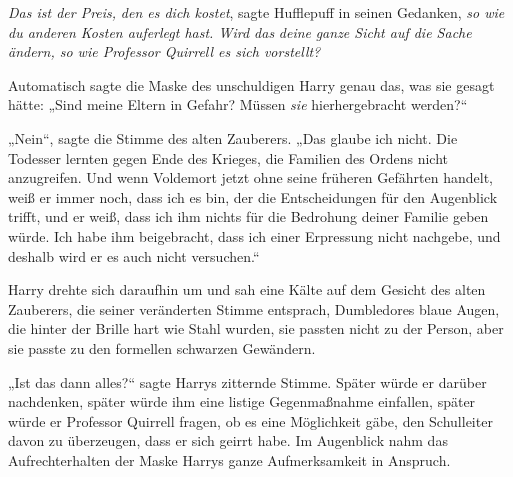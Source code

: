 \emph{Das ist der Preis,} \emph{den es dich kostet}, sagte Hufflepuff in seinen Gedanken, \emph{so wie} \emph{du anderen Kosten auferlegt hast. Wird das} \emph{deine} \emph{ganze Sicht auf die Sache ändern, so wie Professor Quirrell es sich vorstellt?}

Automatisch sagte die Maske des unschuldigen Harry genau das, was sie gesagt hätte:
„Sind meine Eltern in Gefahr? Müssen \emph{sie} hierhergebracht werden?“

„Nein“, sagte die Stimme des alten Zauberers.
„Das glaube ich nicht. Die Todesser lernten gegen Ende des Krieges, die Familien des Ordens nicht anzugreifen. Und wenn Voldemort jetzt ohne seine früheren Gefährten handelt, weiß er immer noch, dass ich es bin, der die Entscheidungen für den Augenblick trifft, und er weiß, dass ich ihm nichts für die Bedrohung deiner Familie geben würde. Ich habe ihm beigebracht, dass ich einer Erpressung nicht nachgebe, und deshalb wird er es auch nicht versuchen.“

Harry drehte sich daraufhin um und sah eine Kälte auf dem Gesicht des alten Zauberers, die seiner veränderten Stimme entsprach, Dumbledores blaue Augen, die hinter der Brille hart wie Stahl wurden, sie passten nicht zu der Person, aber sie passte zu den formellen schwarzen Gewändern.

„Ist das dann alles?“ sagte Harrys zitternde Stimme. Später würde er darüber nachdenken, später würde ihm eine listige Gegenmaßnahme einfallen, später würde er Professor Quirrell fragen, ob es eine Möglichkeit gäbe, den Schulleiter davon zu überzeugen, dass er sich geirrt habe. Im Augenblick nahm das Aufrechterhalten der Maske Harrys ganze Aufmerksamkeit in Anspruch.

